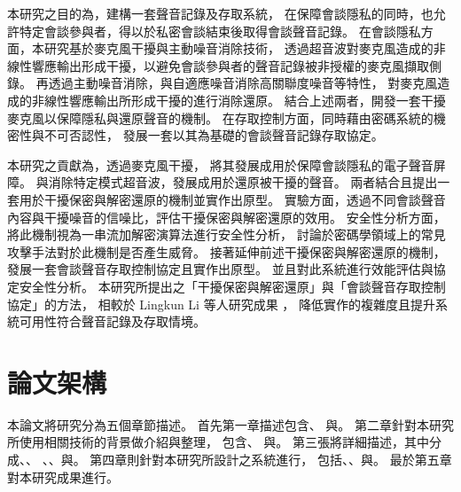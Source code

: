     本研究之目的為，建構一套聲音記錄及存取系統，
在保障會談隱私的同時，也允許特定會談參與者，得以於私密會談結束後取得會談聲音記錄。
在會談隱私方面，本研究基於麥克風干擾與主動噪音消除技術，
透過超音波對麥克風造成的非線性響應輸出形成干擾，以避免會談參與者的聲音記錄被非授權的麥克風擷取側錄。
再透過主動噪音消除，與自適應噪音消除高關聯度噪音等特性，
對麥克風造成的非線性響應輸出所形成干擾的進行消除還原。
結合上述兩者，開發一套干擾麥克風以保障隱私與還原聲音的機制。
在存取控制方面，同時藉由密碼系統的機密性與不可否認性，
發展一套以其為基礎的會談聲音記錄存取協定。

本研究之貢獻為，透過麥克風干擾\cite{chen2020wearable}\cite{roy2017backdoor}，
將其發展成用於保障會談隱私的電子聲音屏障。
與消除特定模式超音波\cite{he2019canceling}，發展成用於還原被干擾的聲音。
兩者結合且提出一套用於干擾保密與解密還原的機制並實作出原型。
實驗方面，透過不同會談聲音內容與干擾噪音的信噪比，評估干擾保密與解密還原的效用。
安全性分析方面，將此機制視為一串流加解密演算法進行安全性分析，
討論於密碼學領域上的常見攻擊手法對於此機制是否產生威脅。
接著延伸前述干擾保密與解密還原的機制，發展一套會談聲音存取控制協定且實作出原型。
並且對此系統進行效能評估與協定安全性分析。
本研究所提出之「干擾保密與解密還原」與「會談聲音存取控制協定」的方法，
相較於 Lingkun Li 等人研究成果 \cite{li2020patronus}，
降低實作的複雜度且提升系統可用性符合聲音記錄及存取情境。


\section{論文架構}\label{section:intro-arch}

    本論文將研究分為五個章節描述。
首先第一章描述包含、
與。
第二章針對本研究所使用相關技術的背景做介紹與整理，
包含、
與。
第三張將詳細描述，其中分成、、
、、與。
第四章則針對本研究所設計之系統進行，
包括、、與。
最於第五章對本研究成果進行。